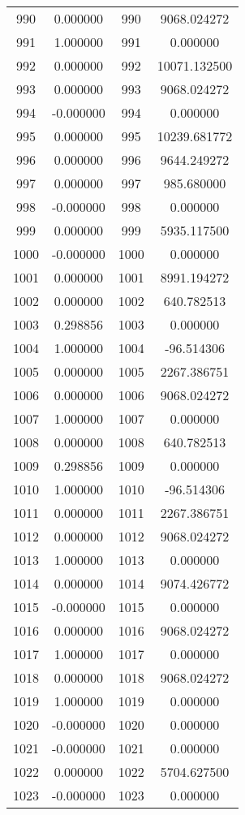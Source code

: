 \documentclass[12pt]{article}
\begin{document}
\begin{longtable}{@{}cccc@{}}
990 & 0.000000 & 990 & 9068.024272 \\
991 & 1.000000 & 991 & 0.000000 \\
992 & 0.000000 & 992 & 10071.132500 \\
993 & 0.000000 & 993 & 9068.024272 \\
994 & -0.000000 & 994 & 0.000000 \\
995 & 0.000000 & 995 & 10239.681772 \\
996 & 0.000000 & 996 & 9644.249272 \\
997 & 0.000000 & 997 & 985.680000 \\
998 & -0.000000 & 998 & 0.000000 \\
999 & 0.000000 & 999 & 5935.117500 \\
1000 & -0.000000 & 1000 & 0.000000 \\
1001 & 0.000000 & 1001 & 8991.194272 \\
1002 & 0.000000 & 1002 & 640.782513 \\
1003 & 0.298856 & 1003 & 0.000000 \\
1004 & 1.000000 & 1004 & -96.514306 \\
1005 & 0.000000 & 1005 & 2267.386751 \\
1006 & 0.000000 & 1006 & 9068.024272 \\
1007 & 1.000000 & 1007 & 0.000000 \\
1008 & 0.000000 & 1008 & 640.782513 \\
1009 & 0.298856 & 1009 & 0.000000 \\
1010 & 1.000000 & 1010 & -96.514306 \\
1011 & 0.000000 & 1011 & 2267.386751 \\
1012 & 0.000000 & 1012 & 9068.024272 \\
1013 & 1.000000 & 1013 & 0.000000 \\
1014 & 0.000000 & 1014 & 9074.426772 \\
1015 & -0.000000 & 1015 & 0.000000 \\
1016 & 0.000000 & 1016 & 9068.024272 \\
1017 & 1.000000 & 1017 & 0.000000 \\
1018 & 0.000000 & 1018 & 9068.024272 \\
1019 & 1.000000 & 1019 & 0.000000 \\
1020 & -0.000000 & 1020 & 0.000000 \\
1021 & -0.000000 & 1021 & 0.000000 \\
1022 & 0.000000 & 1022 & 5704.627500 \\
1023 & -0.000000 & 1023 & 0.000000 \\

\end{longtable}
\end{document}
